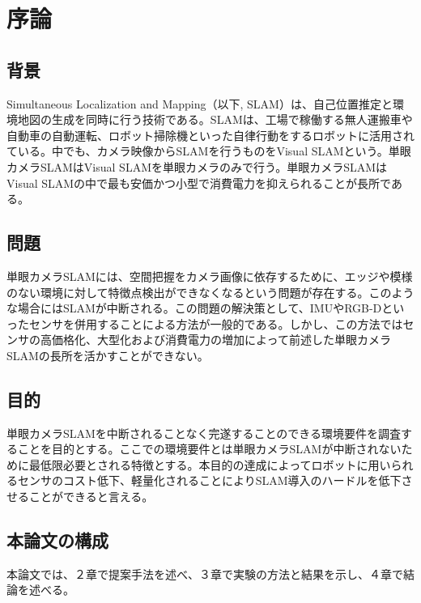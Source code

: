 \chapter{序論}

\section{背景}

Simultaneous Localization and Mapping（以下, SLAM）は、自己位置推定と環境地図の生成を同時に行う技術である。SLAMは、工場で稼働する無人運搬車や自動車の自動運転、ロボット掃除機といった自律行動をするロボットに活用されている。中でも、カメラ映像からSLAMを行うものをVisual SLAMという。単眼カメラSLAMはVisual SLAMを単眼カメラのみで行う。単眼カメラSLAMはVisual SLAMの中で最も安価かつ小型で消費電力を抑えられることが長所である。

\section{問題}

単眼カメラSLAMには、空間把握をカメラ画像に依存するために、エッジや模様のない環境に対して特徴点検出ができなくなるという問題が存在する。このような場合にはSLAMが中断される。この問題の解決策として、IMUやRGB-Dといったセンサを併用することによる方法が一般的である。しかし、この方法ではセンサの高価格化、大型化および消費電力の増加によって前述した単眼カメラSLAMの長所を活かすことができない。

\section{目的}

単眼カメラSLAMを中断されることなく完遂することのできる環境要件を調査することを目的とする。ここでの環境要件とは単眼カメラSLAMが中断されないために最低限必要とされる特徴とする。本目的の達成によってロボットに用いられるセンサのコスト低下、軽量化されることによりSLAM導入のハードルを低下させることができると言える。

\section{本論文の構成}

本論文では、２章で提案手法を述べ、３章で実験の方法と結果を示し、４章で結論を述べる。

%

